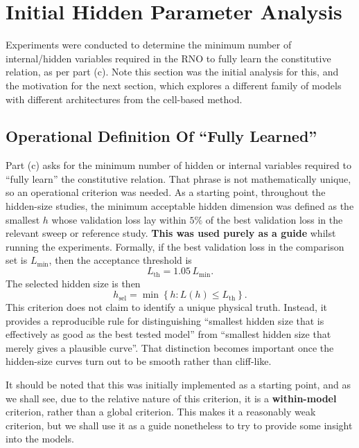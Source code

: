\documentclass[11pt,a4paper, onecolumn]{article}
\begin{document}
\section{Initial Hidden Parameter Analysis}

Experiments were conducted to determine the minimum number of internal/hidden variables required in the RNO to fully learn the
constitutive relation, as per part (c). Note this section was the initial analysis for this, and the motivation for the next section, which explores a different family of models with different architectures from the cell-based method.

\FloatBarrier
\subsection{Operational Definition Of ``Fully Learned''}

Part (c) asks for the minimum number of hidden or internal variables required to ``fully learn'' the constitutive relation. That phrase is not mathematically unique, so an operational criterion was needed. As a starting point, throughout the hidden-size studies, the minimum acceptable hidden dimension was defined as the smallest $h$ whose validation loss lay within $5\%$ of the best validation loss in the relevant sweep or reference study. \textbf{This was used purely as a guide} whilst running the experiments. Formally, if the best validation loss in the comparison set is $L_{\min}$, then the acceptance threshold is
\begin{equation}
L_{\mathrm{th}}=1.05\,L_{\min}.
\label{eq:threshold_definition}
\end{equation}
The selected hidden size is then
\begin{equation}
h_{\mathrm{sel}}=\min\left\{h: L(h)\leq L_{\mathrm{th}}\right\}.
\label{eq:hidden_selection_rule}
\end{equation}
This criterion does not claim to identify a unique physical truth. Instead, it provides a reproducible rule for distinguishing ``smallest hidden size that is effectively as good as the best tested model'' from ``smallest hidden size that merely gives a plausible curve''. That distinction becomes important once the hidden-size curves turn out to be smooth rather than cliff-like.

It should be noted that this was initially implemented as a starting point, and as we shall see, due to the relative nature of this criterion, it is a \textbf{within-model} criterion, rather than a global criterion. This makes it a reasonably weak criterion, but we shall use it as a guide nonetheless to try to provide some insight into the models. 
\end{document}
